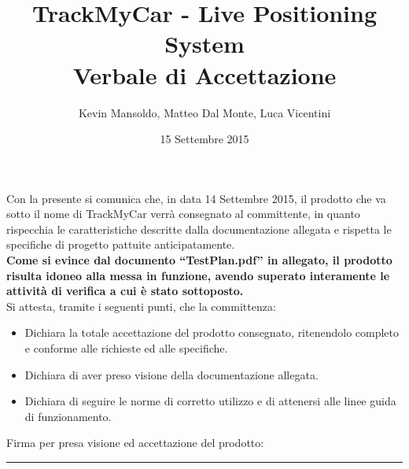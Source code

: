 \documentclass[a4paper,12pt]{article}
\begin{document}
\title{\textbf{TrackMyCar - Live Positioning System} \\ Verbale di Accettazione}

\author{Kevin Mansoldo, Matteo Dal Monte, Luca Vicentini}
\date{15 Settembre 2015}
\maketitle
\pagebreak

Con la presente si comunica che, in data 14 Settembre 2015, il prodotto che va sotto il nome di TrackMyCar verrà consegnato al committente, in quanto rispecchia le caratteristiche descritte dalla documentazione allegata e rispetta le specifiche di progetto pattuite anticipatamente. \\


\textbf{Come si evince dal documento ``TestPlan.pdf'' in allegato, il prodotto risulta idoneo alla messa in funzione, avendo superato interamente le attività di verifica a cui è stato sottoposto.} \\

Si attesta, tramite i seguenti punti, che la committenza:
\begin{itemize}
\item Dichiara la totale accettazione del prodotto consegnato, ritenendolo completo e conforme alle richieste ed alle specifiche.
\item Dichiara di aver preso visione della documentazione allegata.
\item Dichiara di seguire le norme di corretto utilizzo e di attenersi alle linee guida di funzionamento.
\end{itemize}

\vspace{5cm}
Firma per presa visione ed accettazione del prodotto:

\vspace{1cm}
\rule{9.5cm}{0.4pt}
\end{document}

